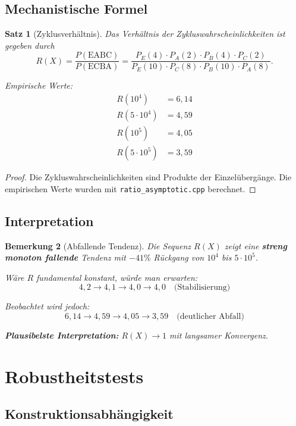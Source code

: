 \documentclass[11pt,a4paper]{article}
\newtheorem{theorem}{Satz}
\newtheorem{remark}[theorem]{Bemerkung}
\begin{document}
\subsection{Mechanistische Formel}

\begin{theorem}[Zyklusverhältnis]
\label{thm:cycle-ratio}
Das Verhältnis der Zykluswahrscheinlichkeiten ist gegeben durch
\[
R(X) = \frac{P(\text{EABC})}{P(\text{ECBA})} = \frac{P_E(4) \cdot P_A(2) \cdot P_B(4) \cdot P_C(2)}{P_E(10) \cdot P_C(8) \cdot P_B(10) \cdot P_A(8)}.
\]

Empirische Werte:
\begin{align*}
R(10^4) &= 6{,}14 \\
R(5 \cdot 10^4) &= 4{,}59 \\
R(10^5) &= 4{,}05 \\
R(5 \cdot 10^5) &= 3{,}59
\end{align*}
\end{theorem}

\begin{proof}
Die Zykluswahrscheinlichkeiten sind Produkte der Einzelübergänge. Die empirischen Werte wurden mit \texttt{ratio\_asymptotic.cpp} berechnet.
\end{proof}

\subsection{Interpretation}

\begin{remark}[Abfallende Tendenz]
Die Sequenz $R(X)$ zeigt eine \textbf{streng monoton fallende} Tendenz mit $-41\%$ Rückgang von $10^4$ bis $5 \cdot 10^5$.

Wäre $R$ fundamental konstant, würde man erwarten:
\[
4{,}2 \to 4{,}1 \to 4{,}0 \to 4{,}0 \quad \text{(Stabilisierung)}
\]

Beobachtet wird jedoch:
\[
6{,}14 \to 4{,}59 \to 4{,}05 \to 3{,}59 \quad \text{(deutlicher Abfall)}
\]

\textbf{Plausibelste Interpretation:} $R(X) \to 1$ mit langsamer Konvergenz.
\end{remark}

\section{Robustheitstests}

\subsection{Konstruktionsabhängigkeit}
\end{document}
